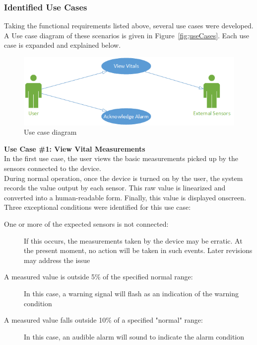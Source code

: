 \documentclass[12pt]{article} %
\begin{document}
\subsubsection{Identified Use Cases}
Taking the functional requirements listed above, several use cases were
 developed. A Use case diagram of these scenarios is given in Figure~\ref{fig;useCases}. Each use case is expanded and explained below.

\begin{figure}[h]
	\centering
	\includegraphics[width=\textwidth]{../design/use_cases_graphical.png}
	\caption{Use case diagram}
	\label{fig:useCases}
\end{figure}

\textbf{Use Case \#1: View Vital Measurements } \\
In the first use case, the user views the basic measurements picked up by the
sensors connected to the device. \\
During normal operation, once the device is turned on by the user, the system
records the value output by each sensor. This raw value is linearized and 
converted into a human-readable form. Finally, this value is displayed onscreen. \\

Three exceptional conditions were identified for this use case: 
\begin{description}
\item [One or more of the expected sensors is not connected:] If this occurs, the measurements taken by the device may be erratic. At the present moment, no action will be taken in such events. Later revisions may address the issue
\item[A measured value is outside 5\% of the specified normal range:] In this case, a warning signal will flash as an indication of the warning condition
\item[A measured value falls outside 10\% of a specified "normal" range:] In this case, an audible alarm will sound to indicate the alarm condition
\end{description}
\end{document}
